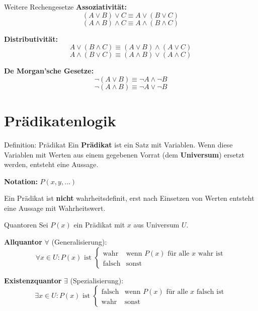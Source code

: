 \documentclass[a4paper, fontsize=7pt]{scrartcl}
\begin{document}
\begin{mainbox}{Weitere Rechengesetze}
\textbf{Assoziativität:}
$$(A \lor B) \lor C \equiv A \lor (B \lor C)$$
$$(A \land B) \land C \equiv A \land (B \land C)$$

\textbf{Distributivität:}
$$A \lor (B \land C) \equiv (A \lor B) \land (A \lor C)$$
$$A \land (B \lor C) \equiv (A \land B) \lor (A \land C)$$

\textbf{De Morgan'sche Gesetze:}
$$\neg(A \lor B) \equiv \neg A \land \neg B$$
$$\neg(A \land B) \equiv \neg A \lor \neg B$$
\end{mainbox}

\section{Prädikatenlogik}

\begin{mainbox}{Definition: Prädikat}
Ein \textbf{Prädikat} ist ein Satz mit Variablen. Wenn diese Variablen mit Werten aus einem gegebenen Vorrat (dem \textbf{Universum}) ersetzt werden, entsteht eine Aussage.

\textbf{Notation:} $P(x, y, \ldots)$

Ein Prädikat ist \textbf{nicht} wahrheitsdefinit, erst nach Einsetzen von Werten entsteht eine Aussage mit Wahrheitswert.
\end{mainbox}

\begin{mainbox}{Quantoren}
Sei $P(x)$ ein Prädikat mit $x$ aus Universum $U$.

\textbf{Allquantor} $\forall$ (Generalisierung):
$$\forall x \in U: P(x) \text{ ist } \begin{cases}
\text{wahr} & \text{wenn } P(x) \text{ für alle } x \text{ wahr ist} \\
\text{falsch} & \text{sonst}
\end{cases}$$

\textbf{Existenzquantor} $\exists$ (Spezialisierung):
$$\exists x \in U: P(x) \text{ ist } \begin{cases}
\text{falsch} & \text{wenn } P(x) \text{ für alle } x \text{ falsch ist} \\
\text{wahr} & \text{sonst}
\end{cases}$$
\end{mainbox}
\end{document}
